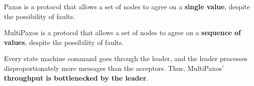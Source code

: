 Paxos is a protocol that allows a set of nodes to agree on a \textbf{single
value}, despite the possibility of faults.

\vspace{1in}

{}

\vspace{1in}

MultiPaxos is a protocol that allows a set of nodes to agree on a
\textbf{sequence of values}, despite the possibility of faults.

\vspace{1in}

{}

\vspace{1in}

Every state machine command goes through the leader, and the leader processes
disproportionately more messages than the acceptors. Thus, MultiPaxos'
\textbf{throughput is bottlenecked by the leader}.
